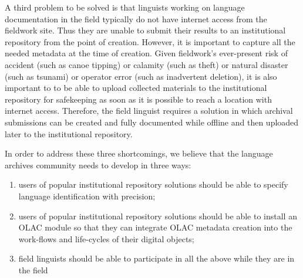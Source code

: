 A third problem to be solved is that linguists working
on language documentation in the field typically do not have internet access from
the fieldwork site. Thus they are unable to submit their
results to an institutional repository from the point of creation.
However, it is important to capture all the needed metadata at the time
of  creation.  Given fieldwork's ever-present risk of accident (such as
canoe tipping) or calamity (such as theft) or natural disaster (such
as tsunami) or operator error (such as inadvertent deletion), it is
also important to to be able to upload
collected materials to the institutional repository for safekeeping
as soon as it is possible to reach a location with internet access.
Therefore, the field linguist requires a solution in which archival
submissions can be created and fully documented while offline and then
uploaded later to the institutional repository.


In order to address these three shortcomings, we believe that the
language archives community needs to develop in three ways:

\begin{enumerate}\setlength{\itemsep}{0pt}
\item users of popular institutional repository solutions should be able
  to specify language identification with precision;

\item users of popular institutional repository solutions should be
    able to install an OLAC module so that they can integrate OLAC
    metadata creation into the work-flows and life-cycles of their
    digital objects;

\item field linguists should be able to participate in all the
    above while they are in the field
\end{enumerate}



